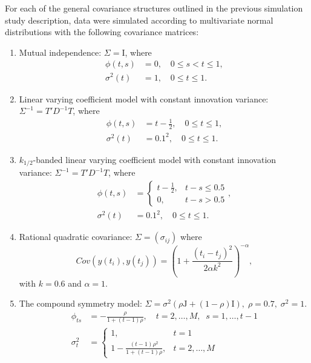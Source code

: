 For each of the general covariance structures outlined in the previous simulation study description, data were simulated according to multivariate normal distributions with the following covariance matrices: 
\begin{enumerate} \label{simulation-model-list}
\item\label{item:cov-type-1} Mutual independence: $\Sigma = \mathrm{I}$, where 
\begin{align*}
\phi\left(t,s\right) &= 0, \quad 0 \le s < t \le 1,\\ 
\sigma^2\left(t\right) &= 1, \quad 0 \le t \le 1.
\end{align*}
\item \label{item:cov-type-2} Linear varying coefficient model with constant innovation variance: $\Sigma^{-1} = T' D^{-1} T$, where 
\begin{align*}
\phi\left(t,s\right) &= t - \frac{1}{2},  \quad 0 \le t \le 1, \\
\sigma^2\left(t\right) &= 0.1^2,  \quad 0 \le t \le 1.
\end{align*}
\item \label{item:cov-type-3} $k_{1/2}$-banded linear varying coefficient model with constant innovation variance: $\Sigma^{-1} = T' D^{-1} T$, where
\begin{align*}
\phi\left(t,s\right) &= \left\{\begin{array}{ll} t - \frac{1}{2}, & t - s \le 0.5\\ 
0, & t - s > 0.5\end{array}\right.,\\
\sigma^2\left(t\right) &= 0.1^2, \quad 0 \le t \le 1.
\end{align*}
\item \label{item:cov-type-4} Rational quadratic covariance: $\Sigma = \left(\sigma_{ij}\right)$ where 
\begin{equation}
Cov\left(y\left(t_i\right), y\left(t_j\right)\right) = \left(1 + \frac{\left(t_i - t_j\right)^2}{2\alpha k^2}\right)^{-\alpha},
\end{equation}
\noindent
with $k = 0.6$ and $\alpha = 1$.
\item \label{item:cov-type-5} The compound symmetry model: $\Sigma = \sigma^2\left(\rho \mathrm{J} + \left(1-\rho\right)\mathrm{I}\right),\; \rho=0.7,\;\sigma^2=1$. 
\begin{align*}
\phi_{ts} &= -\frac{\rho}{1 + \left(t-1\right)\rho}, \quad t = 2, \dots, M,\;\; s = 1, \dots, t-1\\
\sigma_t^2 &= \left\{\begin{array}{ll} 1, & t = 1\\ 1 -\frac{\left(t-1\right)\rho^2}{1 + \left(t-1\right)\rho}, & t = 2, \dots, M \end{array}\right.
\end{align*}
\end{enumerate}
 
